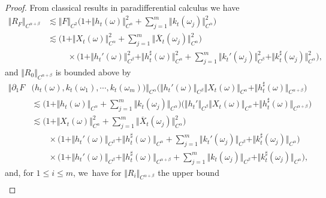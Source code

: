 \documentclass[JEP,XML,SOM,Unicode,published]{cedram}
\theoremstyle{definition}
\newcommand{\norme}[1]{\Vert #1 \Vert}
\begin{document}
\begin{proof}
\begin{minipage}{\textwidth}
\end{minipage}
\par\smallskip\noindent
From classical results in paradifferential calculus we have
\begin{equation*} \begin{split}
\norme{R_F}_{C^{\alpha+\beta}} &\lesssim \norme{F}_{C^2}\bigl(1+\norme{h_t(\omega)}_{C^\alpha}^2+\textstyle\sum_{j=1}^m \norme{k_t(\omega_j)}^2_{C^\alpha}\bigr) \\
&\lesssim \bigl(1 + \norme{X_t(\omega)}^2_{C^\alpha} + \textstyle\sum_{j=1}^m\norme{\overline X_t(\omega_j)}^2_{C^\alpha}\bigr) \\
&\hspace{1cm}\times\bigl(1+\norme{h_t'(\omega)}_{C^\beta}^2 + \norme{h_t^\sharp(\omega)}_{C^\alpha}^2 + \textstyle\sum_{j=1}^m\norme{k_t'(\omega_j)}_{C^\beta}^2 + \norme{k_t^\sharp(\omega_j)}_{C^\alpha}^2\bigr),
\end{split} \end{equation*}
and $\norme{R_0}_{C^{\alpha+\beta}}$ is bounded above by
\begin{equation*} \begin{split}
\big\Vert\partial_1F&\bigl(h_t(\omega), k_t(\omega_1),\cdots, k_t(\omega_m)\bigr)\big\Vert_{C^\alpha}\bigl(\norme{h_t'(\omega)}_{C^\beta} \norme{X_t(\omega)}_{C^\alpha} + \norme{h_t^\sharp(\omega)}_{C^{\alpha+\beta}}\bigr) \\
&\lesssim \bigl(1+\norme{h_t(\omega)}_{C^\alpha} + \textstyle\sum_{j=1}^m\norme{k_t(\omega_j)}_{C^\alpha}\bigr)\bigl(\norme{h_t'}_{C^\beta}\norme{X_t(\omega)}_{C^\alpha} + \norme{h_t^\sharp(\omega)}_{C^{\alpha+\beta}}\bigr) \\
&\lesssim \bigl(1+\norme{X_t(\omega)}^2_{C^\alpha} + \textstyle\sum_{j=1}^m\norme{\overline{X}_t(\omega_j)}^2_{C^\alpha}\bigr) \\
&\qquad\times \bigl(1+\norme{h_t'(\omega)}_{C^\beta} + \norme{h_t^\sharp(\omega)}_{C^\alpha} + \textstyle\sum_{j=1}^m \norme{k_t'(\omega_j)}_{C^\beta} + \norme{k_t^\sharp(\omega_j)}_{C^\alpha} \bigr)
\\
&\qquad\times \bigl(1+ \norme{h_t'(\omega)}_{C^\beta} + \norme{h_t^\sharp(\omega)}_{C^{\alpha+\beta}} + \textstyle\sum_{j=1}^m \norme{k_t(\omega_j)}_{C^\beta} + \norme{k_t^\sharp(\omega_j)}_{C^\alpha}
\bigr),
\end{split} \end{equation*}
and, for $1\leq i\leq m$, we~have for $\norme{R_i}_{C^{\alpha+\beta}}$ the upper bound
\begin{align*}

\end{align*}
\end{proof}
\end{document}

